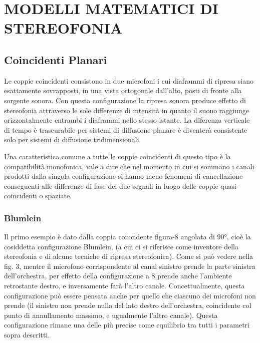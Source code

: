 \section*{MODELLI MATEMATICI DI\\ STEREOFONIA}

\subsection*{Coincidenti Planari}
Le coppie coincidenti consistono in due microfoni i cui diaframmi di ripresa
siano esattamente sovrapposti, in una vista ortogonale dall’alto, posti di
fronte alla sorgente sonora. Con questa configurazione la ripresa sonora produce
effetto di stereofonia attraverso le sole differenze di intensità in quanto il
suono raggiunge orizzontalmente entrambi i diaframmi nello stesso istante.
La diferenza verticale di tempo è trascurabile per sistemi di diffusione planare
è diventerà consistente solo per sistemi di diffusione tridimensionali.

Una caratteristica comune a tutte le coppie coincidenti di questo tipo è la
compatibilità monofonica, vale a dire che nel momento in cui si sommano i canali
prodotti dalla singola configurazione si hanno meno fenomeni di cancellazione
conseguenti alle differenze di fase dei due segnali in luogo delle coppie
quasi-coincidenti o spaziate.
\subsubsection*{Blumlein}
Il primo esempio è dato dalla coppia coincidente figura-8 angolata di $90°$,
cioè la cosiddetta configurazione Blumlein, (a cui ci si riferisce come
inventore della stereofonia e di alcune tecniche di ripresa stereofonica). Come
si può vedere nella fig. 3, mentre il microfono corrispondente al canal
sinistro prende la parte sinistra dell’orchestra, per effetto della configurazione
a 8 prende anche l’ambiente retrostante destro, e inversamente farà l’altro canale.
Concettualmente, questa configurazione può essere pensata anche per quello che
ciascuno dei microfoni non prende (il sinistro non prende nulla del lato destro
dell’orchestra, coincidente col punto di annullamento massimo, e ugualmente
l’altro canale). Questa configurazione rimane una delle più precise come
equilibrio tra tutti i parametri sopra descritti.

